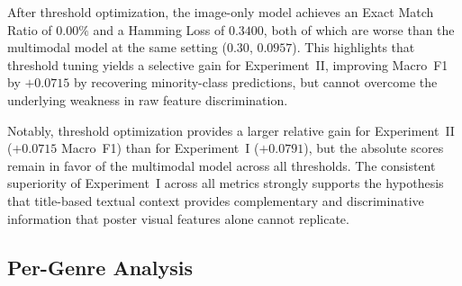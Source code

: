\documentclass[conference]{IEEEtran}
\begin{document}
After threshold optimization, the image-only model achieves an
Exact Match Ratio of $0.00\%$ and a Hamming Loss of $0.3400$, both
of which are worse than the multimodal model at the same setting
($0.30$, $0.0957$). This highlights that threshold tuning yields
a selective gain for Experiment~II, improving Macro~F1 by $+0.0715$
by recovering minority-class predictions, but cannot overcome the
underlying weakness in raw feature discrimination.

Notably, threshold optimization provides a larger relative gain for
Experiment~II ($+0.0715$ Macro~F1) than for Experiment~I ($+0.0791$),
but the absolute scores remain in favor of the multimodal model across
all thresholds. The consistent superiority of Experiment~I across all
metrics strongly supports the hypothesis that title-based textual
context provides complementary and discriminative information that
poster visual features alone cannot replicate.

\begin{table}[!t]
\caption{Overall Performance on Test Set}
\label{tab:results_main}

\centering
\footnotesize
\setlength{\tabcolsep}{3pt}
\renewcommand{\arraystretch}{1.1}

\end{table}

\subsection{Per-Genre Analysis}
\end{document}
